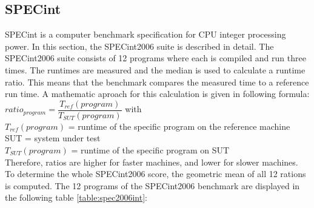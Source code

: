 \subsection{SPECint}
SPECint is a computer benchmark specification for CPU integer processing power. In this section, the SPECint2006 suite is described in detail. The SPECint2006 suite consists of 12 programs where each is compiled and run three times. The runtimes are measured and the median is used to calculate a runtime ratio. This means that the benchmark compares the measured time to a reference run time. A mathematic aproach for this calculation is given in following formula:
$ ratio_{program} = \dfrac{T_{ref}(program)}{T_{SUT}(program)} $ with\\
$ T_{ref}(program) $ = runtime of the specific program on the reference machine\\
SUT = system under test\\
$ T_{SUT}(program) $ = runtime of the specific program on SUT\\
Therefore, ratios are higher for faster machines, and lower for slower machines. To determine the whole SPECint2006 score, the geometric mean of all 12 rations is computed. The 12 programs of the SPECint2006 benchmark are displayed in the following table \ref{table:spec2006int}:
\begin{table}[H]
	\setlength\arrayrulewidth{2pt}
	\centering
	\caption{SPECint2006 programs \cite{specint}}
	\label{table:spec2006int}
\end{table}

